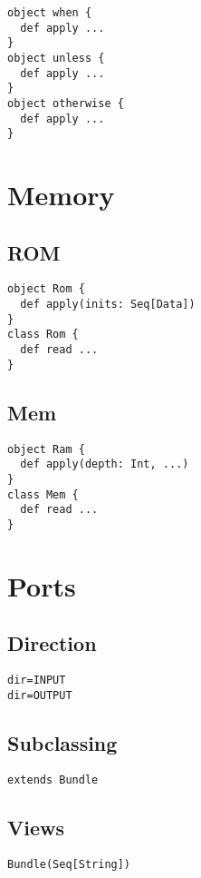 \documentclass[10pt,twocolumn]{article}
\begin{document}
\begin{verbatim}
object when {
  def apply ...
}
object unless {
  def apply ...
}
object otherwise {
  def apply ...
}
\end{verbatim}

\section{Memory}

\subsection{ROM}

\begin{verbatim}
object Rom {
  def apply(inits: Seq[Data])
}
class Rom {
  def read ...
}
\end{verbatim}

\subsection{Mem}

\begin{verbatim}
object Ram {
  def apply(depth: Int, ...)
}
class Mem {
  def read ...
}
\end{verbatim}

\section{Ports}

\subsection{Direction}

\begin{verbatim}
dir=INPUT
dir=OUTPUT
\end{verbatim}


\subsection{Subclassing}

\begin{verbatim}
extends Bundle
\end{verbatim}

\subsection{Views}

\begin{verbatim}
Bundle(Seq[String])
\end{verbatim}
\end{document}
